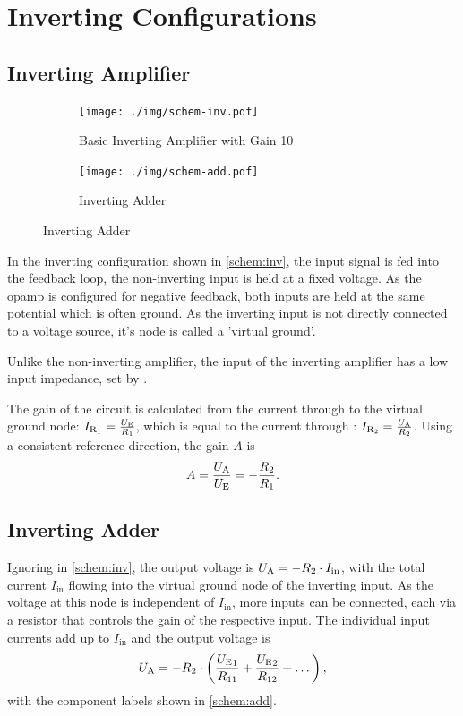 \chapter{Inverting Configurations}
\section{Inverting Amplifier}

\begin{figure}
	\centering
	\begin{subfigure}{0.4\textwidth}
		\centering
		\texttt{[image: ./img/schem-inv.pdf]}
		\caption{Basic Inverting Amplifier with Gain 10}
		\label{schem:inv}
	\end{subfigure}
	\begin{subfigure}{0.4\textwidth}
		\centering
		\texttt{[image: ./img/schem-add.pdf]}
		\caption{Inverting Adder}
		\label{schem:add}
	\end{subfigure}
\end{figure}

In the inverting configuration shown in \autoref{schem:inv}, the input signal is fed into the feedback loop, the non-inverting input is held at a fixed voltage.
As the opamp is configured for negative feedback, both inputs are held at the same potential which is often ground.
As the inverting input is not directly connected to a voltage source, it's node is called a 'virtual ground'.

Unlike the non-inverting amplifier, the input of the inverting amplifier has a low input impedance, set by .

The gain of the circuit is calculated from the current through  to the virtual ground node: $I_{\mathrm{R_1}} = \frac{U_\text{E}}{R_1}$, which is equal to the current through : $I_{\mathrm{R_2}} = \frac{U_\text{A}}{R_2}$.
Using a consistent reference direction, the gain  $A$ is \[A = \frac{U_\text{A}}{U_\text{E}} = -\frac{R_2}{R_1}.\]

\section{Inverting Adder}

Ignoring  in \autoref{schem:inv}, the output voltage \ua is $U_\text{A} = -R_2 \cdot I_\text{in}$, with the total current $I_\text{in}$ flowing into the virtual ground node of the inverting input.
As the voltage at this node is independent of $I_\text{in}$, more inputs can be connected, each via a resistor that controls the gain of the respective input.
The individual input currents add up to $I_\text{in}$ and the output voltage is \[U_\text{A} = -R_2 \cdot \left(\frac{{U_\text{E}}_1}{R_{11}} + \frac{{U_\text{E}}_2}{R_{12}} + \dots\right),\] with the component labels shown in \autoref{schem:add}.

